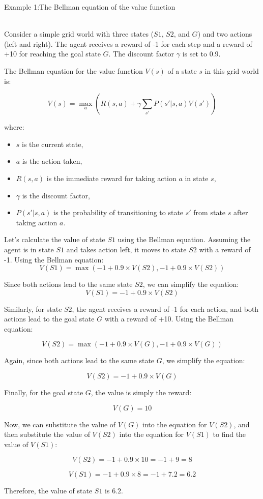 \documentclass{article}
\begin{document}
\begin{Large}
Example 1:The Bellman equation of the value function
\end{Large}
\\
Consider a simple grid world with three states ($S1$, $S2$, and $G$) and two actions (left and right). The agent receives a reward of -1 for each step and a reward of +10 for reaching the goal state $G$. The discount factor $\gamma$ is set to 0.9.

The Bellman equation for the value function $V(s)$ of a state $s$ in this grid world is:

\[
V(s) = \max_a \left( R(s, a) + \gamma \sum_{s'} P(s' | s, a) V(s') \right)
\]

where:
\begin{itemize}
    \item $s$ is the current state,
    \item $a$ is the action taken,
    \item $R(s, a)$ is the immediate reward for taking action $a$ in state $s$,
    \item $\gamma$ is the discount factor,
    \item $P(s' | s, a)$ is the probability of transitioning to state $s'$ from state $s$ after taking action $a$.
\end{itemize}
Let's calculate the value of state $S1$ using the Bellman equation. Assuming the agent is in state $S1$ and takes action left, it moves to state $S2$ with a reward of -1. Using the Bellman equation:
\[
V(S1) = \max \left( -1 + 0.9 \times V(S2), -1 + 0.9 \times V(S2) \right)
\]

Since both actions lead to the same state $S2$, we can simplify the equation:
\[
V(S1) = -1 + 0.9 \times V(S2)
\]

Similarly, for state $S2$, the agent receives a reward of -1 for each action, and both actions lead to the goal state $G$ with a reward of +10. Using the Bellman equation:

\[
V(S2) = \max \left( -1 + 0.9 \times V(G), -1 + 0.9 \times V(G) \right)
\]

Again, since both actions lead to the same state $G$, we simplify the equation:

\[
V(S2) = -1 + 0.9 \times V(G)
\]

Finally, for the goal state $G$, the value is simply the reward:

\[
V(G) = 10
\]

Now, we can substitute the value of $V(G)$ into the equation for $V(S2)$, and then substitute the value of $V(S2)$ into the equation for $V(S1)$ to find the value of $V(S1)$:

\[
V(S2) = -1 + 0.9 \times 10 = -1 + 9 = 8
\]

\[
V(S1) = -1 + 0.9 \times 8 = -1 + 7.2 = 6.2
\]

Therefore, the value of state $S1$ is $6.2$.
\end{document}
